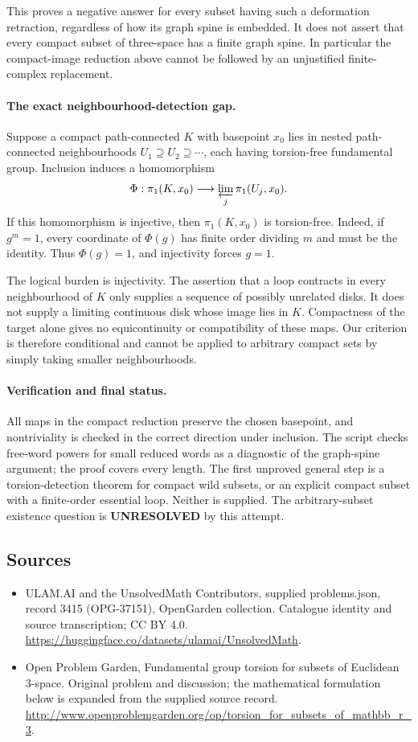 \documentclass[11pt,a4paper]{article}
\begin{document}
This proves a negative answer for every subset having such a deformation retraction, regardless of how its graph spine is embedded. It does not assert that every compact subset of three-space has a finite graph spine. In particular the compact-image reduction above cannot be followed by an unjustified finite-complex replacement.

\paragraph{The exact neighbourhood-detection gap.}
Suppose a compact path-connected $K$ with basepoint $x_0$ lies in nested path-connected neighbourhoods $U_1\supseteq U_2\supseteq\cdots$, each having torsion-free fundamental group. Inclusion induces a homomorphism
\[
 \Phi:\pi_1(K,x_0)\longrightarrow
 \varprojlim_j\pi_1(U_j,x_0).
\]
If this homomorphism is injective, then $\pi_1(K,x_0)$ is torsion-free. Indeed, if $g^m=1$, every coordinate of $\Phi(g)$ has finite order dividing $m$ and must be the identity. Thus $\Phi(g)=1$, and injectivity forces $g=1$.

The logical burden is injectivity. The assertion that a loop contracts in every neighbourhood of $K$ only supplies a sequence of possibly unrelated disks. It does not supply a limiting continuous disk whose image lies in $K$. Compactness of the target alone gives no equicontinuity or compatibility of these maps. Our criterion is therefore conditional and cannot be applied to arbitrary compact sets by simply taking smaller neighbourhoods.

\paragraph{Verification and final status.}
All maps in the compact reduction preserve the chosen basepoint, and nontriviality is checked in the correct direction under inclusion. The script checks free-word powers for small reduced words as a diagnostic of the graph-spine argument; the proof covers every length. The first unproved general step is a torsion-detection theorem for compact wild subsets, or an explicit compact subset with a finite-order essential loop. Neither is supplied. The arbitrary-subset existence question is \textbf{UNRESOLVED} by this attempt.

\subsection{Sources}
\begin{itemize}
\item[S1] ULAM.AI and the UnsolvedMath Contributors, supplied problems.json, record 3415 (OPG-37151), OpenGarden collection. Catalogue identity and source transcription; CC BY 4.0.
\url{https://huggingface.co/datasets/ulamai/UnsolvedMath}.
\item[S2] Open Problem Garden, Fundamental group torsion for subsets of Euclidean 3-space. Original problem and discussion; the mathematical formulation below is expanded from the supplied source record.
\url{http://www.openproblemgarden.org/op/torsion_for_subsets_of_mathbb_r_3}.

\end{itemize}
\end{document}
